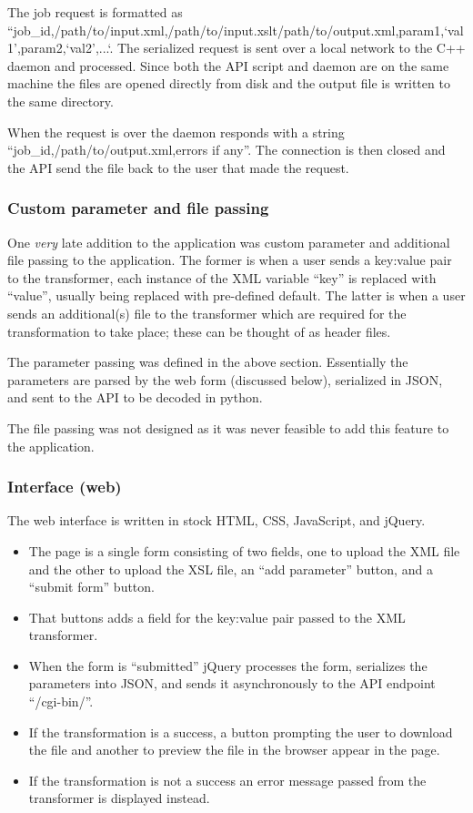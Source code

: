 \begin{enumerate}
\begin{enumerate}
The job request is formatted as ``job_id,/path/to/input.xml,/path/to/input.xslt/path/to/output.xml,param1,`val1',param2,`val2',...`.
The serialized request is sent over a local network to the C++ daemon and processed.
Since both the API script and daemon are on the same machine the files are opened directly from disk and the output file is written to the same directory.

When the request is over the daemon responds with a string ``job_id,/path/to/output.xml,errors if any''.
The connection is then closed and the API send the file back to the user that made the request.

\subsubsection{Custom parameter and file passing}

One \textit{very} late addition to the application was custom parameter and additional file passing to the application.
The former is when a user sends a key:value pair to the transformer, each instance of the XML variable ``key'' is replaced with ``value'', usually being replaced with pre-defined default.
The latter is when a user sends an additional(s) file to the transformer which are required for the transformation to take place; these can be thought of as header files.

The parameter passing was defined in the above section.
Essentially the parameters are parsed by the web form (discussed below), serialized in JSON, and sent to the API to be decoded in python.

The file passing was not designed as it was never feasible to add this feature to the application.

\subsubsection{Interface (web)}

The web interface is written in stock HTML, CSS, JavaScript, and jQuery.

\begin{itemize}
  \item The page is a single form consisting of two fields, one to upload the XML file and the other to upload the XSL file, an ``add parameter'' button, and a ``submit form'' button.
  \item That buttons adds a field for the key:value pair passed to the XML transformer.
  \item When the form is ``submitted'' jQuery processes the form, serializes the parameters into JSON, and sends it asynchronously to the API endpoint ``/cgi-bin/''.
  \item If the transformation is a success, a button prompting the user to download the file and another to preview the file in the browser appear in the page.
  \item If the transformation is not a success an error message passed from the transformer is displayed instead.
\end{itemize}


\end{enumerate}
\end{enumerate}
